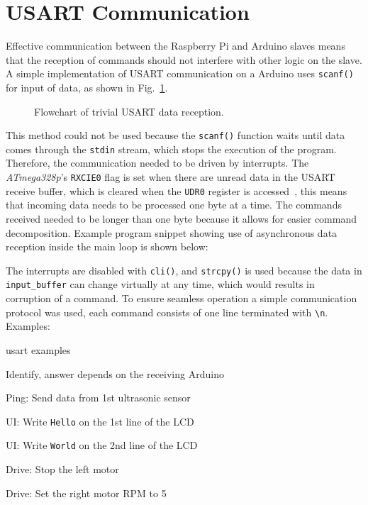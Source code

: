 \documentclass[11pt]{article}
\begin{document}
\newpage
\section{USART Communication}
Effective communication between the Raspberry Pi and Arduino slaves means that the reception of commands should not interfere with other logic on the slave. A simple implementation of USART communication on a Arduino uses \texttt{scanf()} for input of data, as shown in Fig.~\ref{flowchart:scanf}.
\begin{figure}[h]
  \centering
  \caption{Flowchart of trivial USART data reception.}
  \label{flowchart:scanf}
\end{figure}
This method could not be used because the \texttt{scanf()} function waits until data comes through the \texttt{stdin} stream, which stops the execution of the program. Therefore, the communication needed to be driven by interrupts. The \textit{ATmega328p}'s \texttt{RXCIE0} flag is set when there are unread data in the USART receive buffer, which is cleared when the \texttt{UDR0} register is accessed~\cite{ATmega328p-datasheet}, this means that incoming data needs to be processed one byte at a time. The commands received needed to be longer than one byte because it allows for easier command decomposition. Example program snippet showing use of asynchronous data reception inside the main loop is shown below:




The interrupts are disabled with \texttt{cli()}, and \texttt{strcpy()} is used because the data in \texttt{input\_buffer} can change virtually at any time, which would results in corruption of a command.
To ensure seamless operation a simple communication protocol was used, each command consists of one line terminated with \texttt{\textbackslash n}. Examples:
\begin{labeling}{usart examples}
\item [1] Identify, answer depends on the receiving Arduino
\item [p1] Ping: Send data from 1st ultrasonic sensor
\item [m1Hello] UI: Write \texttt{Hello} on the 1st line of the LCD
\item [m2World] UI: Write \texttt{World} on the 2nd line of the LCD
\item [L0] Drive: Stop the left motor
\item [Rp5] Drive: Set the right motor RPM to 5
\end{labeling}
\end{document}
